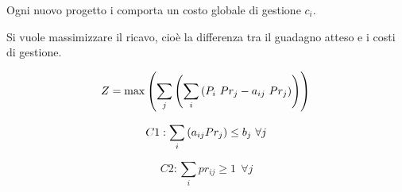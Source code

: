 \documentclass[11pt]{article}
\begin{document}
Ogni nuovo progetto i comporta un costo globale di gestione \(c_i\).

Si vuole massimizzare il ricavo, cioè la differenza tra il guadagno
atteso e i costi di gestione.

\begin{equation*}
Z = \max \left( \sum_j \left( \sum_i \left( P_i \ Pr_{j} -  a_{ij} \ Pr_{j} \right) \right) \right) \\
\end{equation*}

\begin{equation*}
C1: \sum_i  \left( a_{ij} Pr_j \right) \le b_j \ \forall j \\
\end{equation*}

\begin{equation*}
C2: \sum_i pr_{ij} \ge 1  \ \ \forall j
\end{equation*}
\end{document}
